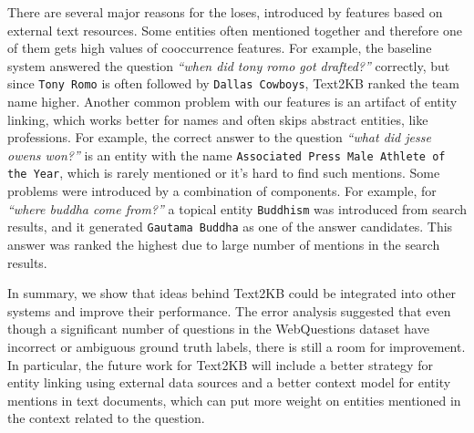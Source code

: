 There are several major reasons for the loses, introduced by features based on external text resources.
Some entities often mentioned together and therefore one of them gets high values of cooccurrence features.
For example, the baseline system answered the question \textit{``when did tony romo got drafted?''} correctly, but since \texttt{Tony Romo} is often followed by \texttt{Dallas Cowboys}, Text2KB ranked the team name higher.
Another common problem with our features is an artifact of entity linking, which works better for names and often skips abstract entities, like professions.
For example, the correct answer to the question \textit{``what did jesse owens won?''} is an entity with the name \texttt{Associated Press Male Athlete of the Year}, which is rarely mentioned or it's hard to find such mentions.
Some problems were introduced by a combination of components.
For example, for \textit{``where buddha come from?''} a topical entity \texttt{Buddhism} was introduced from search results, and it generated \texttt{Gautama Buddha} as one of the answer candidates.
This answer was ranked the highest due to large number of mentions in the search results.





In summary, we show that ideas behind Text2KB could be integrated into other systems and improve their performance.
The error analysis suggested that even though a significant number of questions in the WebQuestions dataset have incorrect or ambiguous ground truth labels, there is still a room for improvement.
In particular, the future work for Text2KB will include a better strategy for entity linking using external data sources and a better context model for entity mentions in text documents, which can put more weight on entities mentioned in the context related to the question.

